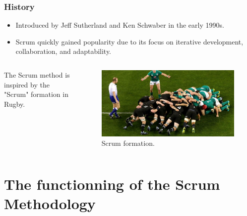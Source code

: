 \documentclass[
	11pt, %
]{beamer}
\begin{document}
\begin{frame}

	\frametitle{History}

	\begin{itemize}
		\item Introduced by Jeff Sutherland and Ken Schwaber  in the early 1990s.
		\item Scrum quickly gained popularity due to its focus on iterative development, collaboration, and adaptability.
	\end{itemize}

	\begin{columns}[c] %
		\begin{column}{0.45\textwidth} %
			The Scrum method is inspired by the "Scrum" formation in Rugby.
		\end{column}
		\begin{column}{0.5\textwidth} %
			\begin{figure}
				\includegraphics[width=0.8\linewidth]{scrum.jpg}
				\caption{Scrum formation.}
			\end{figure}
		\end{column}
	\end{columns}

\end{frame}


\section{The functionning of the Scrum Methodology}
\end{document}
